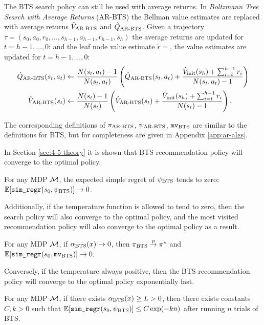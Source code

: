         The BTS search policy can still be used with average returns. In \textit{Boltzmann Tree Search with Average Returns} (AR-BTS) the Bellman value estimates are replaced with average returns ${\hat{V}_{{\textnormal{AR-BTS}}}}$ and ${\hat{Q}_{{\textnormal{AR-BTS}}}}$. Given a trajectory $\tau=(s_0,a_0,r_0,...,s_{h-1},a_{h-1},r_{h-1},s_h)$ the average returns are updated for $t=h-1,...,0$: and the leaf node value estimate $\tilde{r} = $, the value estimates are updated for $t=h-1,...,0$:
        \begin{align}
            {\hat{Q}_{{\textnormal{AR-BTS}}}}(s_t,a_t) &\leftarrow 
                \frac{N(s_t,a_t)-1}{N(s_t,a_t)} \left( {\hat{Q}_{{\textnormal{AR-BTS}}}}(s_t,a_t) 
                    + \frac{{\hat{V}_{\textnormal{init}}}(s_h) + \sum_{i=t}^{h-1} r_i}{N(s_t,a_t)-1} \right) \label{eq:4:arbsts_backup_q} \\
            {\hat{V}_{{\textnormal{AR-BTS}}}}(s_t) &\leftarrow 
                \frac{N(s_t)-1}{N(s_t)} \left( {\hat{V}_{{\textnormal{AR-BTS}}}}(s_t) 
                    + \frac{{\hat{V}_{\textnormal{init}}}(s_h) + \sum_{i=t}^{h-1} r_i}{N(s_t)-1} \right). \label{eq:4:arbsts_backup_v} 
        \end{align}

        The corresponding definitions of ${\pi_{{\textnormal{AR-BTS}}}}$, ${\psi_{{\textnormal{AR-BTS}}}}$, ${\textup{\texttt{mv}}_{{\textnormal{BTS}}}}$ are similar to the definitions for BTS, but for completeness are given in Appendix \ref{app:ar-algs}.

        In Section \ref{sec:4-5-theory} it is shown that BTS recommendation policy will converge to the optimal policy.
        \begin{theorem} \label{thrm:4:bts} 
            For any MDP $\mathcal{M}$, the expected simple regret of ${\psi_{{\textnormal{BTS}}}}$ tends to zero: $\mathbb{E}[{\textnormal{\texttt{sim\_regr}}}(s_0,{\psi_{{\textnormal{BTS}}}})]\rightarrow 0$.
        \end{theorem}

        Additionally, if the temperature function is allowed to tend to zero, then the search policy will also converge to the optimal policy, and the most visited recommendation policy will also converge to the optimal policy as a result.
        \begin{theorem} \label{thrm:4:bts_decay}
            For any MDP $\mathcal{M}$, if ${\alpha_{{\textnormal{BTS}}}}(x)\rightarrow 0$, then ${\pi_{{\textnormal{BTS}}}}\overset{p}{\to} \pi^*$ and $\mathbb{E}[{\textnormal{\texttt{sim\_regr}}}(s_0,{\textup{\texttt{mv}}_{{\textnormal{BTS}}}})]\rightarrow 0$. 
        \end{theorem}

        Conversely, if the temperature always positive, then the BTS recommendation policy will converge to the optimal policy exponentially fast.
        \begin{theorem} \label{thrm:4:bts_exp}
            For any MDP $\mathcal{M}$, if there exists ${\alpha_{{\textnormal{BTS}}}}(x)\geq L > 0$, then there exists constants $C,k>0$ such that $\mathbb{E}[{\textnormal{\texttt{sim\_regr}}}(s_0,{\psi_{{\textnormal{BTS}}}})] \leq C\exp(-kn)$ after running $n$ trials of BTS.
        \end{theorem}

